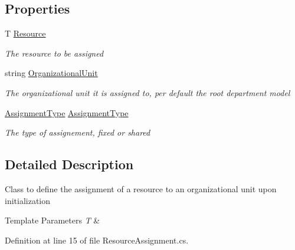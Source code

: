 \subsection*{Properties}
\begin{DoxyCompactItemize}
\item 
T \hyperlink{class_general_health_care_elements_1_1_resource_handling_1_1_resource_assignment_a27eb51cd5c904969fb7f307a72b0bb4c}{Resource}
\begin{DoxyCompactList}\small\item\em The resource to be assigned \end{DoxyCompactList}\item 
string \hyperlink{class_general_health_care_elements_1_1_resource_handling_1_1_resource_assignment_a17a12631a2194cf7203e686bb999992e}{Organizational\+Unit}
\begin{DoxyCompactList}\small\item\em The organizational unit it is assigned to, per default the root department model \end{DoxyCompactList}\item 
\hyperlink{namespace_enums_ac8e46c12834f4cb6a641854bd0676221}{Assignment\+Type} \hyperlink{class_general_health_care_elements_1_1_resource_handling_1_1_resource_assignment_a72b8fd51a5f9358f95b74ea67bc73849}{Assignment\+Type}
\begin{DoxyCompactList}\small\item\em The type of assignement, fixed or shared \end{DoxyCompactList}\end{DoxyCompactItemize}


\subsection{Detailed Description}
Class to define the assignment of a resource to an organizational unit upon initialization 


\begin{DoxyTemplParams}{Template Parameters}
{\em T} & \\
\hline
\end{DoxyTemplParams}


Definition at line 15 of file Resource\+Assignment.\+cs.



